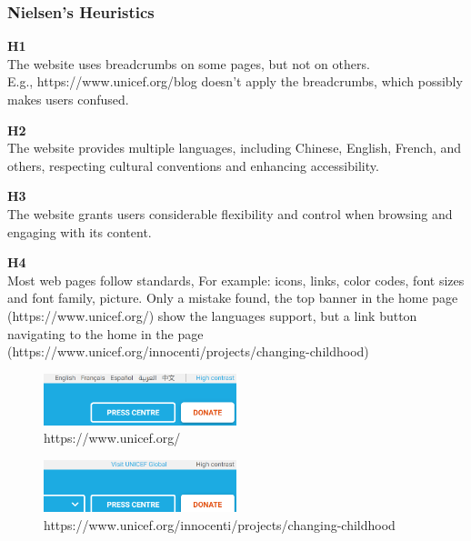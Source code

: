 \subsubsection{Nielsen's Heuristics}
\begin{description}
\item {\textbf{H1} \color{unicefGray}{Visibility of the system status}}\\
The website uses breadcrumbs on some pages, but not on others. \\
E.g., https://www.unicef.org/blog doesn't apply the breadcrumbs, which possibly makes users confused.

\item {\textbf{H2} \color{unicefGray}{Match between system and the real world}}\\
The website provides multiple languages, including Chinese, English, French, and others, respecting cultural conventions and enhancing accessibility.

\item {\textbf{H3} \color{unicefGray}{User control and freedom}}\\
The website grants users considerable flexibility and control when browsing and engaging with its content.

\item {\textbf{H4} \color{unicefGray}{Consistency and standards}}\\
Most web pages follow standards, For example: icons, links, color codes, font sizes and font family, picture. 
Only a mistake found, the top banner in the home page (https://www.unicef.org/) show the languages support, but a link button navigating to the home in the page (https://www.unicef.org/innocenti/projects/changing-childhood)
\begin{figure}[h]
	\centering
	\includegraphics[width=0.5\textwidth]{Resources/Yan/yan_h4_1.png}
	\caption{https://www.unicef.org/}
	\label{fig:h4_1}
\end{figure}
\begin{figure}[h]
	\centering
	\includegraphics[width=0.5\textwidth]{Resources/Yan/yan_h4_2.png}
	\caption{https://www.unicef.org/innocenti/projects/changing-childhood}
	\label{fig:h4_2}
\end{figure}


\end{description}
